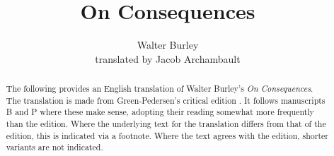 \documentclass[]{article}
\title{On Consequences}
\author{Walter Burley
\\ translated by Jacob Archambault}
\begin{document}
\maketitle

\begin{abstract}
The following provides an English translation of Walter Burley's \textit{On Consequences}. The translation is made from Green-Pedersen's critical edition \cite{Green-Pedersen1980b}. It follows manuscripts B and P where these make sense, adopting their reading somewhat more frequently than the edition.  Where the underlying text for the translation differs from that of the edition, this is indicated via a footnote. Where the text agrees with the edition, shorter variants are not indicated. %
\end{abstract}
\end{document}
